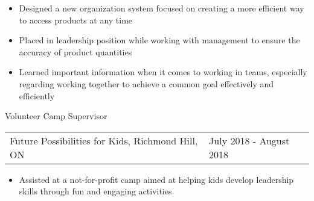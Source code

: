 \documentclass{article}
\begin{document}
	\vspace*{-0.175cm}
	\begin{itemize}
		\itemsep-0.1cm
		\item \normalsize{Designed a new organization system focused on creating a more efficient way to access products at any time}
		\item \normalsize{Placed in leadership position while working with management to ensure the accuracy of product quantities}
		\item Learned important information when it comes to working in teams, especially regarding working together to achieve a common goal effectively and efficiently
	\end{itemize}
	
	\large{Volunteer Camp Supervisor} \\
	\begin{tabular}{m{3.5in} m{3.3in}}
		\normalsize{Future Possibilities for Kids, Richmond Hill, ON} & \hfill \hfill \normalsize{July 2018 - August 2018}
	\end{tabular}
	
	\vspace*{-0.175cm}
	\begin{itemize}
		\itemsep-0.1cm
		\item \normalsize{Assisted at a not-for-profit camp aimed at helping kids develop leadership skills through fun and engaging activities}
	\end{itemize}
	
	
	
\end{document}
